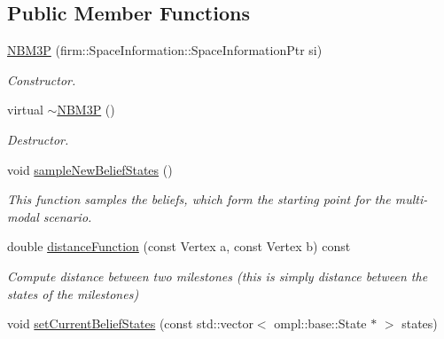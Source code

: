 \subsection*{Public Member Functions}
\begin{DoxyCompactItemize}
\item 
\hypertarget{class_n_b_m3_p_a703b5d47928ffb674053cf2976cbb525}{\hyperlink{class_n_b_m3_p_a703b5d47928ffb674053cf2976cbb525}{N\-B\-M3\-P} (firm\-::\-Space\-Information\-::\-Space\-Information\-Ptr si)}\label{class_n_b_m3_p_a703b5d47928ffb674053cf2976cbb525}

\begin{DoxyCompactList}\small\item\em Constructor. \end{DoxyCompactList}\item 
\hypertarget{class_n_b_m3_p_a7559518458faed268cc7bdfe17e2b8fe}{virtual \hyperlink{class_n_b_m3_p_a7559518458faed268cc7bdfe17e2b8fe}{$\sim$\-N\-B\-M3\-P} ()}\label{class_n_b_m3_p_a7559518458faed268cc7bdfe17e2b8fe}

\begin{DoxyCompactList}\small\item\em Destructor. \end{DoxyCompactList}\item 
void \hyperlink{class_n_b_m3_p_a50c2f81984f30c6f129d3384420ec1ff}{sample\-New\-Belief\-States} ()
\begin{DoxyCompactList}\small\item\em This function samples the beliefs, which form the starting point for the multi-\/modal scenario. \end{DoxyCompactList}\item 
\hypertarget{class_n_b_m3_p_ab3017a37c491eee1d450b3179de18e0c}{double \hyperlink{class_n_b_m3_p_ab3017a37c491eee1d450b3179de18e0c}{distance\-Function} (const Vertex a, const Vertex b) const }\label{class_n_b_m3_p_ab3017a37c491eee1d450b3179de18e0c}

\begin{DoxyCompactList}\small\item\em Compute distance between two milestones (this is simply distance between the states of the milestones) \end{DoxyCompactList}\item 
\hypertarget{class_n_b_m3_p_aa0f173baf3e948e6b8888f6fe9fce1f2}{void \hyperlink{class_n_b_m3_p_aa0f173baf3e948e6b8888f6fe9fce1f2}{set\-Current\-Belief\-States} (const std\-::vector$<$ ompl\-::base\-::\-State $\ast$ $>$ states)}\label{class_n_b_m3_p_aa0f173baf3e948e6b8888f6fe9fce1f2}


\end{DoxyCompactItemize}
